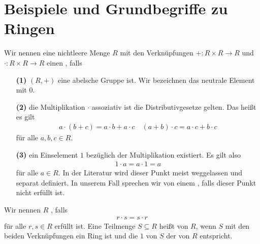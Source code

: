 \section{Beispiele und Grundbegriffe zu Ringen}

\begin{df}\label{skript:7.1}
	Wir nennen eine nichtleere Menge $ R $ mit den Verknüpfungen
	$ + : R \times R \to R $ und $ \cdot : R \times R \to R $
	einen , falls 			
	\begin{enumerate}
		\item[\textbf{(1)}]
		$ (R,+) $ eine abelsche Gruppe ist. Wir bezeichnen das neutrale Element mit $ 0 $.
		
		\item[\textbf{(2)}]
		die Multiplikation $ \cdot $ assoziativ ist die Distributivgesetze  gelten.
		Das heißt es gilt
		\begin{align*}
		a \cdot ( b+c) = a\cdot b + a \cdot c 
		\quad
		(a+b) \cdot c = a \cdot c + b \cdot c
		\end{align*}
		für alle $ a,b,c \in R $.
		
		\item[\textbf{(3)}] 
		ein Einselement $ 1 $ bezüglich der Multiplikation existiert. Es gilt also
		\begin{align*}
		1 \cdot a = a \cdot 1 = a
		\end{align*}
		für alle $ a \in R $.
		In der Literatur wird dieser Punkt meist weggelassen und separat definiert.
		In unserem Fall sprechen wir von einem , falls dieser Punkt nicht erfüllt ist.
	\end{enumerate}
	Wir nennen $ R $ , falls			
	\begin{align*}
	r \cdot s = s \cdot r
	\end{align*}
	für alle $ r,s \in R $ erfüllt ist.
	Eine Teilmenge $ S \subseteq R $ heißt  von $ R $, wenn $ S $ mit den beiden Verknüpfungen ein Ring ist und die $ 1 $ von $ S $ der von $ R $ entspricht.		
\end{df}

